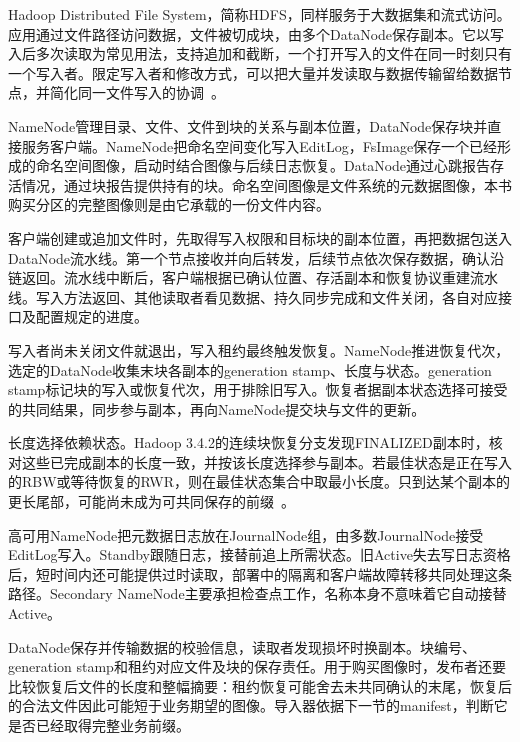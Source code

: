 Hadoop Distributed File System，简称HDFS，同样服务于大数据集和流式访问。应用通过文件路径访问数据，文件被切成块，由多个DataNode保存副本。它以写入后多次读取为常见用法，支持追加和截断，一个打开写入的文件在同一时刻只有一个写入者。限定写入者和修改方式，可以把大量并发读取与数据传输留给数据节点，并简化同一文件写入的协调~\cite{hdfs342-storage}。

NameNode管理目录、文件、文件到块的关系与副本位置，DataNode保存块并直接服务客户端。NameNode把命名空间变化写入EditLog，FsImage保存一个已经形成的命名空间图像，启动时结合图像与后续日志恢复。DataNode通过心跳报告存活情况，通过块报告提供持有的块。命名空间图像是文件系统的元数据图像，本书购买分区的完整图像则是由它承载的一份文件内容。


客户端创建或追加文件时，先取得写入权限和目标块的副本位置，再把数据包送入DataNode流水线。第一个节点接收并向后转发，后续节点依次保存数据，确认沿链返回。流水线中断后，客户端根据已确认位置、存活副本和恢复协议重建流水线。写入方法返回、其他读取者看见数据、持久同步完成和文件关闭，各自对应接口及配置规定的进度。

写入者尚未关闭文件就退出，写入租约最终触发恢复。NameNode推进恢复代次，选定的DataNode收集末块各副本的generation stamp、长度与状态。generation stamp标记块的写入或恢复代次，用于排除旧写入。恢复者据副本状态选择可接受的共同结果，同步参与副本，再向NameNode提交块与文件的更新。

长度选择依赖状态。Hadoop 3.4.2的连续块恢复分支发现FINALIZED副本时，核对这些已完成副本的长度一致，并按该长度选择参与副本。若最佳状态是正在写入的RBW或等待恢复的RWR，则在最佳状态集合中取最小长度。只到达某个副本的更长尾部，可能尚未成为可共同保存的前缀~\cite{hdfs342-storage}。


高可用NameNode把元数据日志放在JournalNode组，由多数JournalNode接受EditLog写入。Standby跟随日志，接替前追上所需状态。旧Active失去写日志资格后，短时间内还可能提供过时读取，部署中的隔离和客户端故障转移共同处理这条路径。Secondary NameNode主要承担检查点工作，名称本身不意味着它自动接替Active。

DataNode保存并传输数据的校验信息，读取者发现损坏时换副本。块编号、generation stamp和租约对应文件及块的保存责任。用于购买图像时，发布者还要比较恢复后文件的长度和整幅摘要：租约恢复可能舍去未共同确认的末尾，恢复后的合法文件因此可能短于业务期望的图像。导入器依据下一节的manifest，判断它是否已经取得完整业务前缀。

